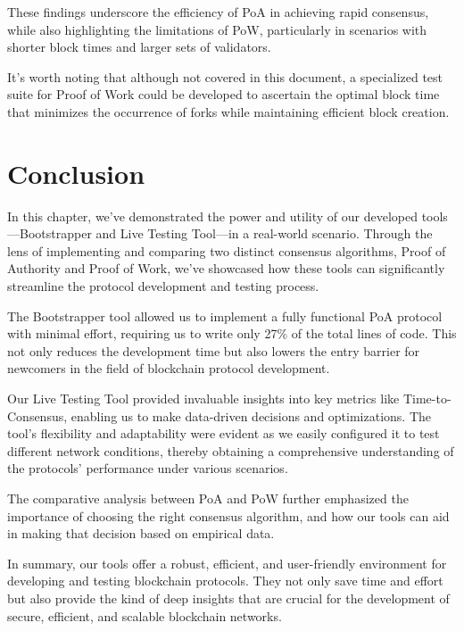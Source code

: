 These findings underscore the efficiency of PoA in achieving rapid consensus, while also highlighting the limitations of PoW, particularly in scenarios with shorter block times and larger sets of validators.

It's worth noting that although not covered in this document, a specialized test suite for Proof of Work could be developed to ascertain the optimal block time that minimizes the occurrence of forks while maintaining efficient block creation.


\section{Conclusion}

In this chapter, we've demonstrated the power and utility of our developed tools—Bootstrapper and Live Testing Tool—in a real-world scenario. Through the lens of implementing and comparing two distinct consensus algorithms, Proof of Authority and Proof of Work, we've showcased how these tools can significantly streamline the protocol development and testing process.

The Bootstrapper tool allowed us to implement a fully functional PoA protocol with minimal effort, requiring us to write only 27\% of the total lines of code. This not only reduces the development time but also lowers the entry barrier for newcomers in the field of blockchain protocol development.

Our Live Testing Tool provided invaluable insights into key metrics like Time-to-Consensus, enabling us to make data-driven decisions and optimizations. The tool's flexibility and adaptability were evident as we easily configured it to test different network conditions, thereby obtaining a comprehensive understanding of the protocols' performance under various scenarios.

The comparative analysis between PoA and PoW further emphasized the importance of choosing the right consensus algorithm, and how our tools can aid in making that decision based on empirical data.

In summary, our tools offer a robust, efficient, and user-friendly environment for developing and testing blockchain protocols. They not only save time and effort but also provide the kind of deep insights that are crucial for the development of secure, efficient, and scalable blockchain networks.

